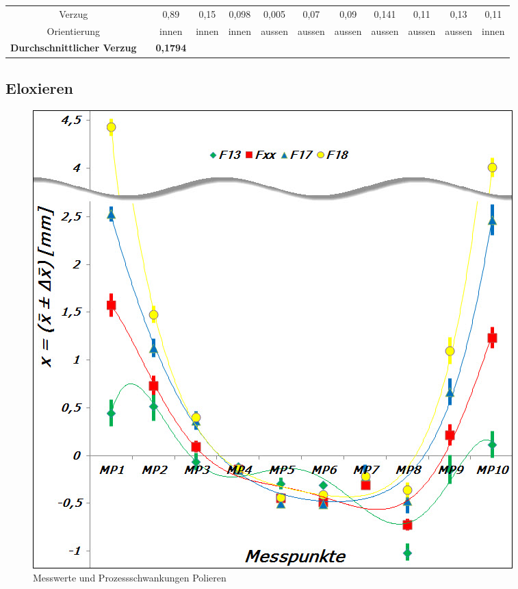 \documentclass[12pt,a4paper,parskip,twoside,BCOR5mm,headsepline]{scrartcl}
\begin{document}
\begin{description*}
\begin{table}
\begin{tabular}{cccccccccccc}
Verzug && 0,89 &0,15  &0,098  & 0,005 &0,07 &0,09  &0,141 &0,11  &0,13 & 0,11 \\
Orientierung &&innen  &innen  &innen &aussen  &aussen  &aussen  & aussen &aussen  & aussen &innen \\
\textbf{Durchschnittlicher Verzug} && \textbf{0,1794} &&&&&&&&&\\
\bottomrule

















\end{tabular}
\end{table}












\newpage


















\newpage




  
 
\subsection{Eloxieren}


\begin{figure}[hbtp]
\centering
\includegraphics[width=.8\textwidth]{elox}
\caption{Messwerte und Prozessschwankungen Polieren}
\label{fig:elox}
\end{figure}


\end{description*}
\end{document}
